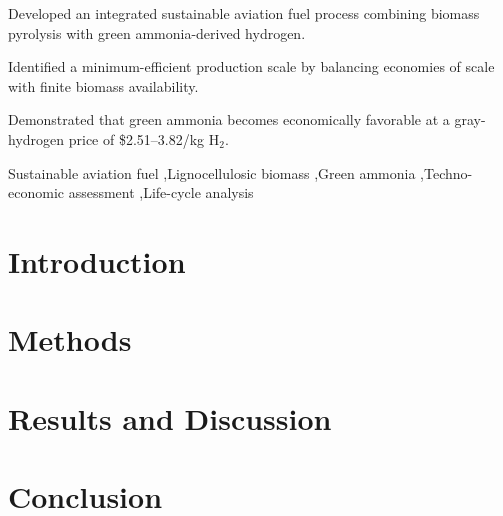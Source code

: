 \documentclass[a4paper,fleqn]{cas-sc}
\begin{document}

\begin{highlights}
\item Developed an integrated sustainable aviation fuel process combining biomass pyrolysis with green ammonia-derived hydrogen. 
\item Identified a minimum-efficient production scale by balancing economies of scale with finite biomass availability.
\item Demonstrated that green ammonia becomes economically favorable at a gray-hydrogen price of \$2.51--3.82/kg H$_2$.
\end{highlights}


\begin{keywords}
Sustainable aviation fuel \sep Lignocellulosic biomass \sep Green ammonia \sep Techno-economic assessment \sep Life-cycle analysis 
\end{keywords}

\maketitle

\section{Introduction}\label{sec:intro}


\section{Methods}\label{sec:methods}


\section{Results and Discussion}\label{sec:results}


\section{Conclusion}\label{sec:conclusion}


\end{document}
